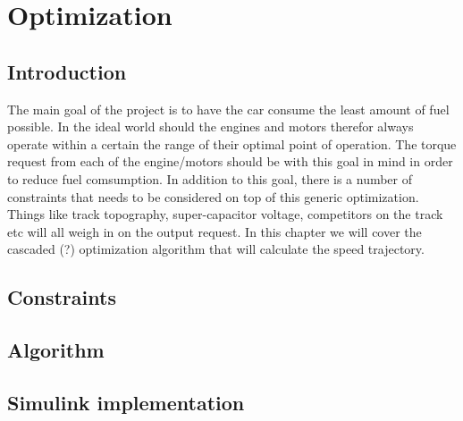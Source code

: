 \chapter{Optimization}
\section{Introduction}
The main goal of the project is to have the car consume the least amount of fuel
possible. In the ideal world should the engines and motors therefor always
operate within a certain the range of their optimal point of operation. The
torque request from each of the engine/motors should be with this goal in mind
in order to reduce fuel comsumption. In addition to this goal, there is a number
of constraints that needs to be considered on top of this generic optimization.
Things like track topography, super-capacitor voltage, competitors on the track
etc will all weigh in on the output request. In this chapter we will cover the
cascaded (?) optimization algorithm that will calculate the speed trajectory.

\section{Constraints}

\section{Algorithm}

\section{Simulink implementation}
